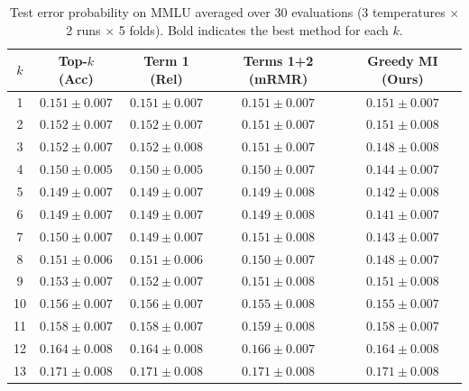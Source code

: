 \documentclass{article}
\theoremstyle{plain}
\theoremstyle{definition}
\theoremstyle{remark}
\begin{document}
\begin{table}[ht]
\centering
\caption{Test error probability on MMLU averaged over 30 evaluations (3 temperatures $\times$ 2 runs $\times$ 5 folds). Bold indicates the best method for each $k$.}
\label{tab:mmlu_results}
\small
\begin{tabular}{ccccc}
\toprule
$k$ & Top-$k$ (Acc) & Term 1 (Rel) & Terms 1+2 (mRMR) & Greedy MI (Ours) \\
\midrule
1  & $0.151 \pm 0.007$ & $0.151 \pm 0.007$ & $0.151 \pm 0.007$ & $0.151 \pm 0.007$ \\
2  & $0.152 \pm 0.007$ & $0.152 \pm 0.007$ & $0.151 \pm 0.007$ & $0.151 \pm 0.008$ \\
3  & $0.152 \pm 0.007$ & $0.152 \pm 0.008$ & $0.151 \pm 0.007$ & $\mathbf{0.148 \pm 0.008}$ \\
4  & $0.150 \pm 0.005$ & $0.150 \pm 0.005$ & $0.150 \pm 0.007$ & $\mathbf{0.144 \pm 0.007}$ \\
5  & $0.149 \pm 0.007$ & $0.149 \pm 0.007$ & $0.149 \pm 0.008$ & $\mathbf{0.142 \pm 0.008}$ \\
6  & $0.149 \pm 0.007$ & $0.149 \pm 0.007$ & $0.149 \pm 0.008$ & $\mathbf{0.141 \pm 0.007}$ \\
7  & $0.150 \pm 0.007$ & $0.149 \pm 0.007$ & $0.151 \pm 0.008$ & $\mathbf{0.143 \pm 0.007}$ \\
8  & $0.151 \pm 0.006$ & $0.151 \pm 0.006$ & $0.150 \pm 0.007$ & $\mathbf{0.148 \pm 0.007}$ \\
9  & $0.153 \pm 0.007$ & $0.152 \pm 0.007$ & $\mathbf{0.151 \pm 0.008}$ & $\mathbf{0.151 \pm 0.008}$ \\
10 & $0.156 \pm 0.007$ & $0.156 \pm 0.007$ & $0.155 \pm 0.008$ & $\mathbf{0.155 \pm 0.007}$ \\
11 & $\mathbf{0.158 \pm 0.007}$ & $\mathbf{0.158 \pm 0.007}$ & $0.159 \pm 0.008$ & $\mathbf{0.158 \pm 0.007}$ \\
12 & $\mathbf{0.164 \pm 0.008}$ & $\mathbf{0.164 \pm 0.008}$ & $0.166 \pm 0.007$ & $\mathbf{0.164 \pm 0.008}$ \\
13 & $0.171 \pm 0.008$ & $0.171 \pm 0.008$ & $0.171 \pm 0.008$ & $0.171 \pm 0.008$ \\
\bottomrule
\end{tabular}
\end{table}
\end{document}
